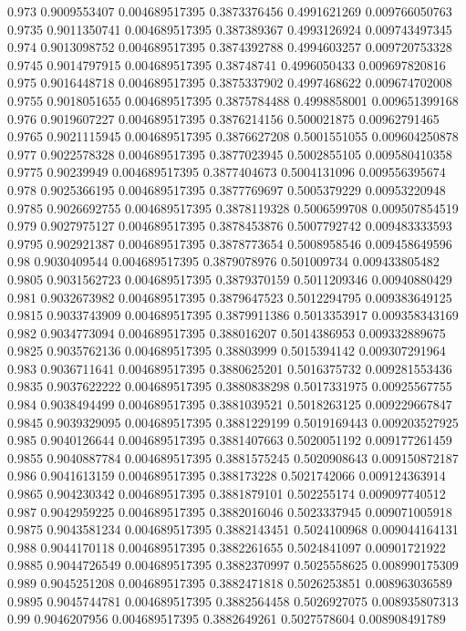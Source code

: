 {0.973 0.9009553407 0.004689517395 0.3873376456 0.4991621269 0.009766050763
0.9735 0.9011350741 0.004689517395 0.387389367 0.4993126924 0.009743497345
0.974 0.9013098752 0.004689517395 0.3874392788 0.4994603257 0.009720753328
0.9745 0.9014797915 0.004689517395 0.38748741 0.4996050433 0.009697820816
0.975 0.9016448718 0.004689517395 0.3875337902 0.4997468622 0.009674702008
0.9755 0.9018051655 0.004689517395 0.3875784488 0.4998858001 0.009651399168
0.976 0.9019607227 0.004689517395 0.3876214156 0.500021875 0.00962791465
0.9765 0.9021115945 0.004689517395 0.3876627208 0.5001551055 0.009604250878
0.977 0.9022578328 0.004689517395 0.3877023945 0.5002855105 0.009580410358
0.9775 0.90239949 0.004689517395 0.3877404673 0.5004131096 0.009556395674
0.978 0.9025366195 0.004689517395 0.3877769697 0.5005379229 0.00953220948
0.9785 0.9026692755 0.004689517395 0.3878119328 0.5006599708 0.009507854519
0.979 0.9027975127 0.004689517395 0.3878453876 0.5007792742 0.009483333593
0.9795 0.902921387 0.004689517395 0.3878773654 0.5008958546 0.009458649596
0.98 0.9030409544 0.004689517395 0.3879078976 0.501009734 0.009433805482
0.9805 0.9031562723 0.004689517395 0.3879370159 0.5011209346 0.00940880429
0.981 0.9032673982 0.004689517395 0.3879647523 0.5012294795 0.009383649125
0.9815 0.9033743909 0.004689517395 0.3879911386 0.5013353917 0.009358343169
0.982 0.9034773094 0.004689517395 0.388016207 0.5014386953 0.009332889675
0.9825 0.9035762136 0.004689517395 0.38803999 0.5015394142 0.009307291964
0.983 0.9036711641 0.004689517395 0.3880625201 0.5016375732 0.009281553436
0.9835 0.9037622222 0.004689517395 0.3880838298 0.5017331975 0.00925567755
0.984 0.9038494499 0.004689517395 0.3881039521 0.5018263125 0.009229667847
0.9845 0.9039329095 0.004689517395 0.3881229199 0.5019169443 0.009203527925
0.985 0.9040126644 0.004689517395 0.3881407663 0.5020051192 0.009177261459
0.9855 0.9040887784 0.004689517395 0.3881575245 0.5020908643 0.009150872187
0.986 0.9041613159 0.004689517395 0.388173228 0.5021742066 0.009124363914
0.9865 0.904230342 0.004689517395 0.3881879101 0.502255174 0.009097740512
0.987 0.9042959225 0.004689517395 0.3882016046 0.5023337945 0.009071005918
0.9875 0.9043581234 0.004689517395 0.3882143451 0.5024100968 0.009044164131
0.988 0.9044170118 0.004689517395 0.3882261655 0.5024841097 0.00901721922
0.9885 0.9044726549 0.004689517395 0.3882370997 0.5025558625 0.008990175309
0.989 0.9045251208 0.004689517395 0.3882471818 0.5026253851 0.008963036589
0.9895 0.9045744781 0.004689517395 0.3882564458 0.5026927075 0.008935807313
0.99 0.9046207956 0.004689517395 0.3882649261 0.5027578604 0.008908491789
}
